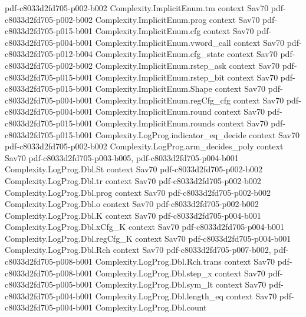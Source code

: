 \begin{theorem}
  {pdf-c8033d2fd705-p002-b002}
\proofstep
  {Complexity.ImplicitEnum.tm}
  {context}
  {Sav70}
  {pdf-c8033d2fd705-p002-b002}
\proofstep
  {Complexity.ImplicitEnum.prog}
  {context}
  {Sav70}
  {pdf-c8033d2fd705-p015-b001}
\proofstep
  {Complexity.ImplicitEnum.cfg}
  {context}
  {Sav70}
  {pdf-c8033d2fd705-p004-b001}
\proofstep
  {Complexity.ImplicitEnum.vword_call}
  {context}
  {Sav70}
  {pdf-c8033d2fd705-p012-b004}
\proofstep
  {Complexity.ImplicitEnum.cfg_state}
  {context}
  {Sav70}
  {pdf-c8033d2fd705-p002-b002}
\proofstep
  {Complexity.ImplicitEnum.rstep_ask}
  {context}
  {Sav70}
  {pdf-c8033d2fd705-p015-b001}
\proofstep
  {Complexity.ImplicitEnum.rstep_bit}
  {context}
  {Sav70}
  {pdf-c8033d2fd705-p015-b001}
\proofstep
  {Complexity.ImplicitEnum.Shape}
  {context}
  {Sav70}
  {pdf-c8033d2fd705-p004-b001}
\proofstep
  {Complexity.ImplicitEnum.regCfg_cfg}
  {context}
  {Sav70}
  {pdf-c8033d2fd705-p004-b001}
\proofstep
  {Complexity.ImplicitEnum.round}
  {context}
  {Sav70}
  {pdf-c8033d2fd705-p015-b001}
\proofstep
  {Complexity.ImplicitEnum.rounds}
  {context}
  {Sav70}
  {pdf-c8033d2fd705-p015-b001}
\proofstep
  {Complexity.LogProg.indicator_eq_decide}
  {context}
  {Sav70}
  {pdf-c8033d2fd705-p002-b002}
\proofstep
  {Complexity.LogProg.arm_decides_poly}
  {context}
  {Sav70}
  {pdf-c8033d2fd705-p003-b005,
    pdf-c8033d2fd705-p004-b001}
\proofstep
  {Complexity.LogProg.Dbl.St}
  {context}
  {Sav70}
  {pdf-c8033d2fd705-p002-b002}
\proofstep
  {Complexity.LogProg.Dbl.tr}
  {context}
  {Sav70}
  {pdf-c8033d2fd705-p002-b002}
\proofstep
  {Complexity.LogProg.Dbl.prog}
  {context}
  {Sav70}
  {pdf-c8033d2fd705-p002-b002}
\proofstep
  {Complexity.LogProg.Dbl.o}
  {context}
  {Sav70}
  {pdf-c8033d2fd705-p002-b002}
\proofstep
  {Complexity.LogProg.Dbl.K}
  {context}
  {Sav70}
  {pdf-c8033d2fd705-p004-b001}
\proofstep
  {Complexity.LogProg.Dbl.xCfg_K}
  {context}
  {Sav70}
  {pdf-c8033d2fd705-p004-b001}
\proofstep
  {Complexity.LogProg.Dbl.regCfg_K}
  {context}
  {Sav70}
  {pdf-c8033d2fd705-p004-b001}
\proofstep
  {Complexity.LogProg.Dbl.Rch}
  {context}
  {Sav70}
  {pdf-c8033d2fd705-p007-b002,
    pdf-c8033d2fd705-p008-b001}
\proofstep
  {Complexity.LogProg.Dbl.Rch.trans}
  {context}
  {Sav70}
  {pdf-c8033d2fd705-p008-b001}
\proofstep
  {Complexity.LogProg.Dbl.step_x}
  {context}
  {Sav70}
  {pdf-c8033d2fd705-p005-b001}
\proofstep
  {Complexity.LogProg.Dbl.sym_lt}
  {context}
  {Sav70}
  {pdf-c8033d2fd705-p004-b001}
\proofstep
  {Complexity.LogProg.Dbl.length_eq}
  {context}
  {Sav70}
  {pdf-c8033d2fd705-p004-b001}
\proofstep
  {Complexity.LogProg.Dbl.count}

\end{theorem}
